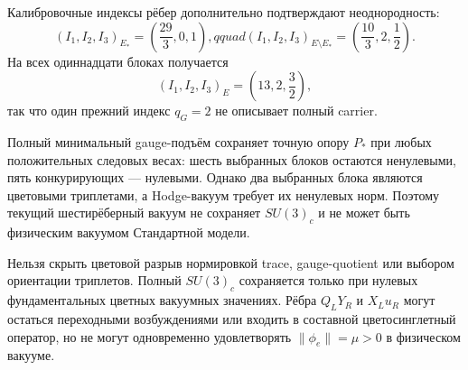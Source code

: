 Калибровочные индексы рёбер дополнительно подтверждают неоднородность:
\begin{equation}
 (I_1,I_2,I_3)_{E_*}
 =\left(\frac{29}{3},0,1\right),qquad
 (I_1,I_2,I_3)_{E\setminus E_*}
 =\left(\frac{10}{3},2,\frac12\right).
 \label{eq:v7-full-edge-sector-indices}
\end{equation}
На всех одиннадцати блоках получается
\begin{equation}
 (I_1,I_2,I_3)_{E}=\left(13,2,\frac32\right),
 \label{eq:v7-full-edge-total-indices}
\end{equation}
так что один прежний индекс $q_G=2$ не описывает полный carrier.

\begin{theorem}
Полный минимальный gauge-подъём сохраняет точную опору $P_*$ при любых
положительных следовых весах: шесть выбранных блоков остаются ненулевыми,
пять конкурирующих --- нулевыми. Однако два выбранных блока являются
цветовыми триплетами, а Hodge-вакуум требует их ненулевых норм. Поэтому
текущий шестирёберный вакуум не сохраняет $SU(3)_c$ и не может быть
физическим вакуумом Стандартной модели.
\end{theorem}

\begin{nogocriterion}
Нельзя скрыть цветовой разрыв нормировкой trace, gauge-quotient или выбором
ориентации триплетов. Полный $SU(3)_c$ сохраняется только при нулевых
фундаментальных цветных вакуумных значениях. Рёбра $Q_LY_R$ и $X_Lu_R$
могут остаться переходными возбуждениями или входить в составной
цветосинглетный оператор, но не могут одновременно удовлетворять
$\|\phi_e\|=\mu>0$ в физическом вакууме.
\end{nogocriterion}

